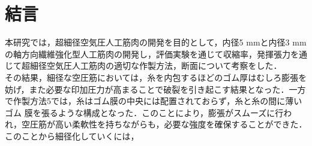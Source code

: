 \newpage
\section{結言}
本研究では，超細径空気圧人工筋肉の開発を目的として，内径5 mmと内径3 mmの軸方向繊維強化型人工筋肉の開発し，評価実験を通じて収縮率，発揮張力を通じて超細径空気圧人工筋肉の適切な作製方法，断面について考察をした．\\
 その結果，細径な空圧筋においては，糸を内包するほどのゴム厚はむしろ膨張を妨げ，また必要な印加圧力が高まることで破裂を引き起こす結果となった．一方で作製方法5では，糸はゴム膜の中央には配置されておらず，糸と糸の間に薄いゴム
 膜を張るような構成となった．このことにより，膨張がスムーズに行われ，空圧筋が高い柔軟性を持ちながらも，必要な強度を確保することができた．このことから細径化していくには，
 
